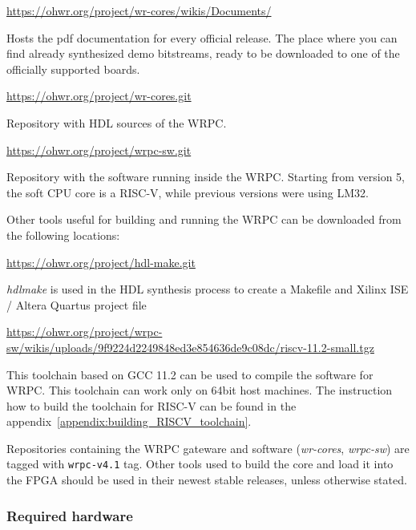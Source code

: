 \documentclass[a4paper, 12pt]{article}
\renewcommand{\_}{\underscore\allowbreak}
\begin{document}
\begin{itemize*}

\item \url{https://ohwr.org/project/wr-cores/wikis/Documents/}

  Hosts the pdf documentation for every official release.
  The place where you can find already synthesized demo bitstreams,
  ready to be downloaded to one of the officially supported boards.

\item \url{https://ohwr.org/project/wr-cores.git}

  Repository with HDL sources of the WRPC.

\item \url{https://ohwr.org/project/wrpc-sw.git}

  Repository with the software running inside the WRPC. Starting from
  version 5, the soft CPU core is a RISC-V, while previous versions were
  using LM32.

\end{itemize*}
Other tools useful for building and running the WRPC can be downloaded from the
following locations:

\begin{itemize*}

\item \url{https://ohwr.org/project/hdl-make.git}

  \textit{hdlmake} is used in the HDL synthesis process to create a Makefile and
  Xilinx ISE / Altera Quartus project file

\item {\small\url{https://ohwr.org/project/wrpc-sw/wikis/uploads/9f9224d2249848ed3e854636de9c08dc/riscv-11.2-small.tgz}}

  This toolchain based on GCC 11.2 can be used to compile the software
  for WRPC. This toolchain can work only on 64bit host machines. The
  instruction how to build the toolchain for RISC-V can be found in
  the appendix~\ref{appendix:building_RISCV_toolchain}.

\end{itemize*}
Repositories containing the WRPC gateware and software (\textit{wr-cores},
\textit{wrpc-sw}) are tagged with \texttt{wrpc-v4.1} tag. Other tools used to
build the core and load it into the FPGA should be used in their newest stable
releases, unless otherwise stated.

\subsubsection{Required hardware}
\label{Required hardware}
\end{document}
